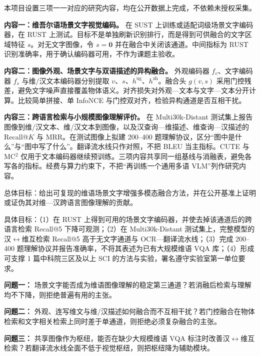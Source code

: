 \justifying
\NSFCBodyText


本项目设置三项一一对应的研究内容，均在公开数据上完成，不依赖未授权采集。

\textbf{内容一：维吾尔语场景文字视觉编码。} 在 SUST 上训练或适配词级场景文字编码器，在 RUST 上测试。目标不是单独刷新识别排行，而是得到可供融合的文字区域特征 $s$。对无文字图像，令 $s=\mathbf{0}$ 并在融合中关闭该通道。中间指标为 RUST 识别准确率，用于确认编码器可用，不作为课题主验收。

\textbf{内容二：图像外观、场景文字与双语描述的异构融合。} 外观编码器 $f_v$、文字编码器 $f_s$ 与维/汉文本编码器分别提取 $v$、$s$、$h^{\mathrm{ug}}$、$h^{\mathrm{zh}}$。融合头 $g(v,s)$ 采用门控残差，避免文字噪声直接覆盖物体语义。对齐损失对外观—文本与文字—文本分开计算。比较简单拼接、单 InfoNCE 与门控双对齐，检验异构通道是否互相干扰。

\textbf{内容三：跨语言检索与小规模图像理解评价。} 在 Multi30k-Distant 测试集上报告图像到维/汉文本、维/汉文本到图像，以及汉查询—维描述、维查询—汉描述的 Recall@$K$ 与 MRR。在测试图像上拟建 200--400 题理解协议，区分“图中是什么”与“图中写了什么”。翻译流水线只作对照，不把 BLEU 当主指标。CUTE 与 MC$^2$ 仅用于文本编码器继续预训练。三项内容共享同一组基线与消融表，避免各写各的指标。经费与算力约束下，不把“再训练一个通用多语 VLM”列作研究内容。


总体目标：给出可复现的维语场景文字增强多模态融合方法，并在公开基准上证明或证伪其对维—汉跨语言图像理解的贡献。

具体目标：（1）在 RUST 上得到可用的场景文字编码器，并使去掉该通道后的跨语言检索 Recall@5 下降可观测；（2）在 Multi30k-Distant 测试集上，完整模型的汉$\leftrightarrow$维互检索 Recall@5 高于无文字通道与 OCR—翻译流水线；（3）完成 200--400 题理解协议并报告准确率，不将其表述为已有大规模维语 VQA 库；（4）形成可支撑 1 篇中科院三区及以上 SCI 的方法与实验，署名遵守实验室第一单位要求。


\textbf{问题一：} 场景文字能否成为维语图像理解的稳定第三通道？若消融后检索与理解均不下降，则拒绝普遍有用的主张。

\textbf{问题二：} 外观、连写维文与维/汉描述如何融合而不互相干扰？若门控融合在物体检索和文字相关检索上同时差于单通道，则拒绝必须复杂融合的主张。

\textbf{问题三：} 共享图像作为枢纽，能否在缺少大规模维语 VQA 标注时改善汉$\leftrightarrow$维互检索？若翻译流水线全面不低于视觉枢纽，则把枢纽降为辅助模块。
